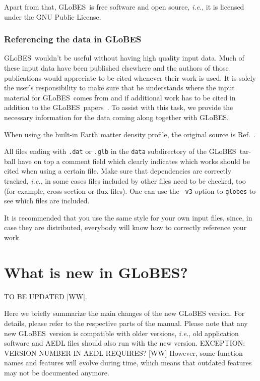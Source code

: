 \documentclass[a4paper,12pt,twoside]{book}
\newcommand{\ie}{{\it i.e.}}
\newcommand{\Ref}{Ref.}
\newcommand{\GLOBES}{{\sf GLoBES}}
\begin{document}
Apart from that, \GLOBES\ is free software and open source, \ie, it is 
licensed under the GNU Public License.

\subsection*{Referencing the data in \GLOBES}
\label{ref_data}

\index{norm}{Referencing!data in \GLOBES}
\GLOBES\ wouldn't be useful without having high quality input data.
Much of these input data have been published elsewhere and the authors
of those publications would appreciate to be cited whenever their work
is used. It is solely the user's responsibility 
to make sure that he understands where the input material for \GLOBES\ comes
from and if additional work has to be cited in addition to the 
\GLOBES\ papers~\cite{globes_paper,globes_paper_two}. To assist with this task, we provide  the necessary information for the data coming along together with \GLOBES.

When using the built-in Earth matter density profile, the 
original source is \Ref~\cite{Stacey}.

All files ending with \verb+.dat+ or \verb+.glb+ 
in the \verb+data+ subdirectory of the \GLOBES\ tar-ball have on top a comment field which clearly indicates which works should be
cited when using a certain file. Make sure that dependencies are correctly
tracked, \ie , in some cases files included by other files need to be 
checked, too (for example, cross section or flux files). One can use 
the \verb+-v3+ option to \verb+globes+ to see which files
are included.

It is recommended that you use the same style for your own input files, since, in case they are distributed, everybody will know how to correctly reference your work.

\chapter*{What is new in \GLOBES ?}

TO BE UPDATED [WW].

Here we briefly summarize the main changes of the new GLoBES version. For details, please
refer to the respective parts of the manual. Please note that any new \GLOBES\ version is
compatible with older versions, \ie, old application software and AEDL files should also run with the new version. EXCEPTION: VERSION NUMBER IN AEDL REQUIRES? [WW] However, some function names and features will
evolve during time, which means that outdated features may not be documented anymore.
\end{document}
